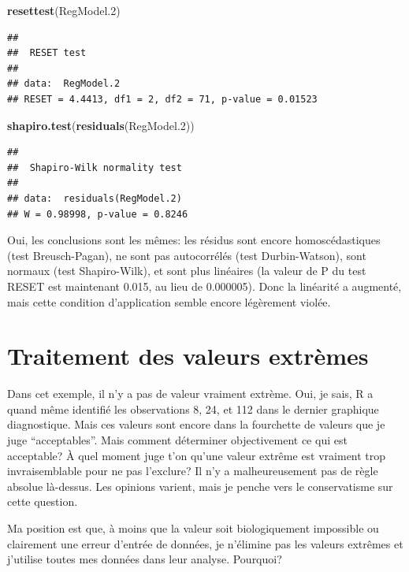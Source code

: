 \documentclass[12pt,]{book}
\newenvironment{Shaded}{\begin{snugshade}}{\end{snugshade}}
\newcommand{\FloatTok}[1]{\textcolor[rgb]{0.00,0.00,0.81}{#1}}
\newcommand{\KeywordTok}[1]{\textcolor[rgb]{0.13,0.29,0.53}{\textbf{#1}}}
\newcommand{\NormalTok}[1]{#1}
\begin{document}
\begin{Shaded}
\begin{Highlighting}[]
\KeywordTok{resettest}\NormalTok{(RegModel}\FloatTok{.2}\NormalTok{)}
\end{Highlighting}
\end{Shaded}

\begin{verbatim}
## 
##  RESET test
## 
## data:  RegModel.2
## RESET = 4.4413, df1 = 2, df2 = 71, p-value = 0.01523
\end{verbatim}

\begin{Shaded}
\begin{Highlighting}[]
\KeywordTok{shapiro.test}\NormalTok{(}\KeywordTok{residuals}\NormalTok{(RegModel}\FloatTok{.2}\NormalTok{))}
\end{Highlighting}
\end{Shaded}

\begin{verbatim}
## 
##  Shapiro-Wilk normality test
## 
## data:  residuals(RegModel.2)
## W = 0.98998, p-value = 0.8246
\end{verbatim}

Oui, les conclusions sont les mêmes: les résidus sont encore homoscédastiques (test Breusch-Pagan), ne sont pas autocorrélés (test Durbin-Watson), sont normaux (test Shapiro-Wilk), et sont plus linéaires (la valeur de P du test RESET est maintenant 0.015, au lieu de 0.000005). Donc la linéarité a augmenté, mais cette condition d'application semble encore légèrement violée.

\hypertarget{traitement-des-valeurs-extruxe8mes}{%
\section{Traitement des valeurs extrèmes}\label{traitement-des-valeurs-extruxe8mes}}

Dans cet exemple, il n'y a pas de valeur vraiment extrème. Oui, je sais, R a quand même identifié les observations 8, 24, et 112 dans le dernier graphique diagnostique. Mais ces valeurs sont encore dans la fourchette de valeurs que je juge ``acceptables''. Mais comment déterminer objectivement ce qui est acceptable? À quel moment juge t'on qu'une valeur extrême est vraiment trop invraisemblable pour ne pas l'exclure? Il n'y a malheureusement pas de règle absolue là-dessus. Les opinions varient, mais je penche vers le conservatisme sur cette question.

Ma position est que, à moins que la valeur soit biologiquement impossible ou clairement une erreur d'entrée de données, je n'élimine pas les valeurs extrêmes et j'utilise toutes mes données dans leur analyse. Pourquoi?
\end{document}

